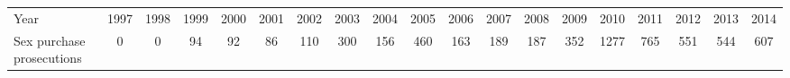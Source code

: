 \begin{tabular}{lcccccccccccccccccc}
Year & 1997 & 1998 & 1999 & 2000 & 2001 & 2002 & 2003 & 2004 & 2005 & 2006 & 2007 & 2008 & 2009 & 2010 & 2011 & 2012 & 2013 & 2014 \\
Sex purchase prosecutions & 0 & 0 & 94 & 92 & 86 & 110 & 300 & 156 & 460 & 163 & 189 & 187 & 352 & 1277 & 765 & 551 & 544 & 607 \\
\end{tabular}
